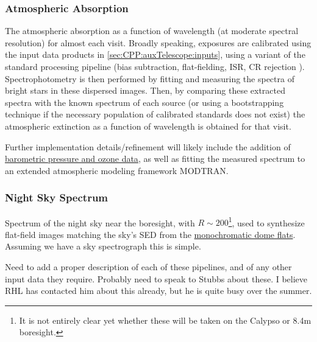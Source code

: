 \subsubsection{Atmospheric Absorption}\label{sec:CPP:aux:atmosphericAbsorption}
The atmospheric absorption as a function of wavelength (at moderate spectral resolution) for almost each visit.
\alg Broadly speaking, exposures are calibrated using the input data products in \secsymbol\ref{sec:CPP:auxTelescope:inputs}, using a variant of the standard processing pipeline (bias subtraction, flat-fielding, ISR, CR rejection \etc). Spectrophotometry is then performed by fitting and measuring the spectra of bright stars in these dispersed images. Then, by comparing these extracted spectra with the known spectrum of each source (or using a bootstrapping technique if the necessary population of calibrated standards does not exist) the atmospheric extinction as a function of wavelength is obtained for that visit.

Further implementation details/refinement will likely include the addition of \hyperref[sec:CPP:inputs:atmosphericData]{barometric pressure and ozone data}, as well as fitting the measured spectrum to an extended atmospheric modeling framework \eg MODTRAN. 


 
\subsubsection{Night Sky Spectrum}\label{sec:CPP:aux:nightSkySpectrum}
Spectrum of the night sky near the \auxtelescope boresight, with $R \sim 200$\footnote{It is not entirely clear yet whether these will be taken on the Calypso or 8.4m boresight.}, used to synthesize flat-field images matching the sky's SED from the \hyperref[sec:CPP:output:monoFlat]{monochromatic dome flats}.
\alg Assuming we have a sky spectrograph this is simple.

\begin{note}
	Need to add a proper description of each of these pipelines, and of any other input data they require. Probably need to speak to Stubbs about these. I believe RHL has contacted him about this already, but he is quite busy over the summer.
\end{note}




